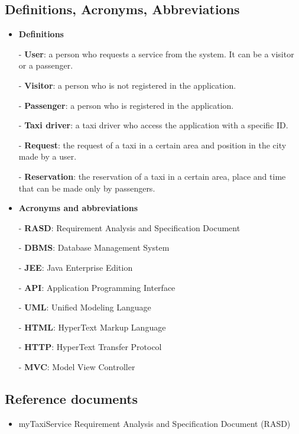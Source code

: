 	\subsection{Definitions, Acronyms, Abbreviations}
		\begin{itemize}
			\item \textbf{Definitions}
				\item[-] \textbf{User}: a person who requests a service from the system. It can be a visitor or a passenger.
				\item[-] \textbf{Visitor}: a person who is not registered in the application.
				\item[-] \textbf{Passenger}: a person who is registered in the application.
				\item[-] \textbf{Taxi driver}: a taxi driver who access the application with a specific ID.
				\item[-] \textbf{Request}: the request of a taxi in a certain area and position in the city made by a user.
				\item[-] \textbf{Reservation}: the reservation of a taxi in a certain area, place and time that can be made only by passengers.

			\item \textbf{Acronyms and abbreviations}
				\item[-] \textbf{RASD}: Requirement Analysis and Specification Document
				\item[-] \textbf{DBMS}: Database Management System
				\item[-] \textbf{JEE}: Java Enterprise Edition
				\item[-] \textbf{API}: Application Programming Interface
				\item[-] \textbf{UML}: Unified Modeling Language
				\item[-] \textbf{HTML}: HyperText Markup Language
				\item[-] \textbf{HTTP}: HyperText Transfer Protocol
				\item[-] \textbf{MVC}: Model View Controller
			
		\end{itemize}
	\subsection{Reference documents}
		\begin{itemize}
			\item myTaxiService Requirement Analysis and Specification Document (RASD)
	\newpage		
		\end{itemize}
